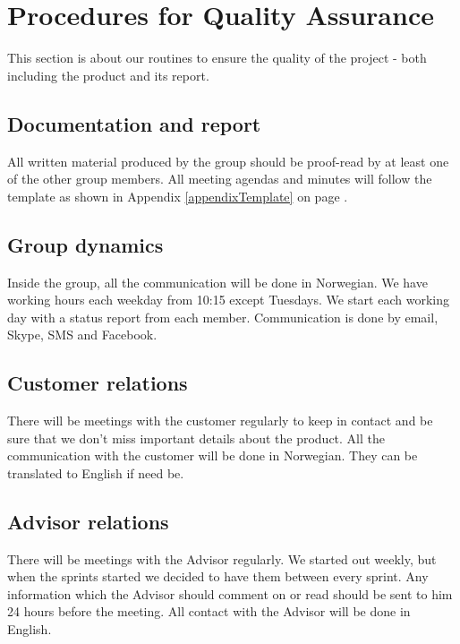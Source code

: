 \section{Procedures for Quality Assurance}
This section is about our routines to ensure the quality of the project - both including the product and its report. 

\subsection{Documentation and report}
All written material produced by the group should be proof-read by at least one of the other group members. All meeting agendas and minutes will follow the template as shown in Appendix \ref{appendixTemplate} on page \pageref{appendixTemplate}.


\subsection{Group dynamics}
Inside the group, all the communication will be done in Norwegian. We have working hours each weekday from 10:15 except Tuesdays. We start each working day with a status report from each member. 
Communication is done by email, Skype, SMS and Facebook. 

\subsection{Customer relations}
There will be meetings with the customer regularly to keep in contact and be sure that we don't miss important details about the product. All the communication with the customer will be done in Norwegian. They can be translated to English if need be.


\subsection{Advisor relations}
There will be meetings with the Advisor regularly. We started out weekly, but when the sprints started we decided to have them between every sprint. Any information which the Advisor should comment on or read should be sent to him 24 hours before the meeting. All contact with the Advisor will be done in English. 
